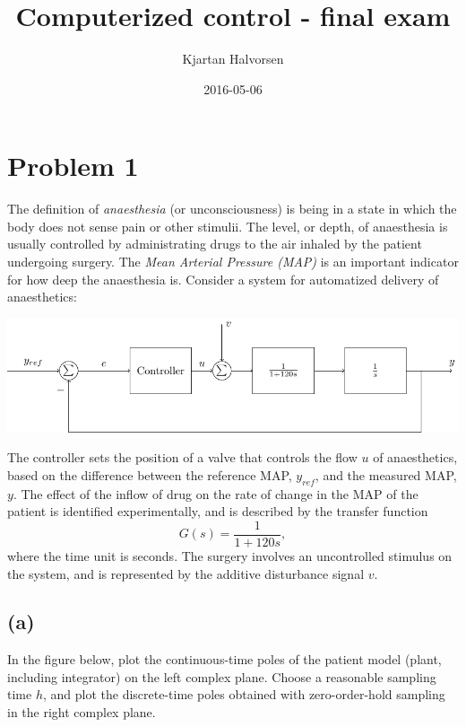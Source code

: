 \documentclass[a4paper]{scrartcl}
\author{Kjartan Halvorsen}
\date{2016-05-06}
\title{Computerized control - final exam}
\begin{document}
\maketitle

\section*{Problem 1}
\label{sec-1}
The definition of \emph{anaesthesia} (or unconsciousness) is being in a state in which the body does not sense pain or other stimulii. The level, or depth, of anaesthesia is usually controlled by administrating drugs to the air inhaled by the patient undergoing surgery. The \emph{Mean Arterial Pressure (MAP)} is an important indicator for how deep the anaesthesia is. Consider a system for automatized delivery of anaesthetics:
\begin{center}
\includegraphics[width=0.999\linewidth]{anaesthesia}
\end{center}
The controller sets the position of a valve that controls the flow $u$ of anaesthetics, based on the difference between the reference MAP, $y_{ref}$, and the measured MAP, $y$.  The effect of the inflow of drug on the rate of change in the MAP of the patient is identified experimentally, and is described by the transfer function 
\[ G(s) = \frac{1}{1+120s}, \] where the time unit is seconds. The surgery involves an uncontrolled stimulus on the system, and is represented by the additive disturbance signal $v$.


\subsection*{(a)}
\label{sec-1-1}
In the figure below, plot the continuous-time poles of the patient model (plant, including integrator) on the left complex plane. Choose a reasonable sampling time $h$, and plot the discrete-time poles obtained with zero-order-hold sampling in the right complex plane. 
\end{document}
